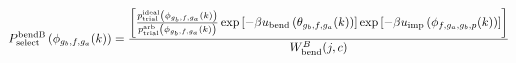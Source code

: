 \documentclass[12pt]{article}
\begin{document}
\begin{displaymath}
P_{\rm select}^{\rm bend B}\left(\phi_{g_b,f,g_a}(k)\right) = 
{{
\left[
{{p_{\rm trial}^{\rm ideal}\left(\phi_{g_b,f,g_a}(k)\right)}\over{ p_{\rm trial}^{\rm arb}\left(\phi_{g_b,f,g_a}(k)\right)}}
\exp\left[-\beta u_{\rm bend}\left(\theta_{g_b,f,g_a}(k)\right)\right]
\exp\left[-\beta u_{\rm imp}\left(\phi_{f,g_a,g_b,p}(k)\right)\right]
\right]
}
\over
{
W_{\rm bend}^{B}(j,c)
}}
\end{displaymath}
\end{document}
